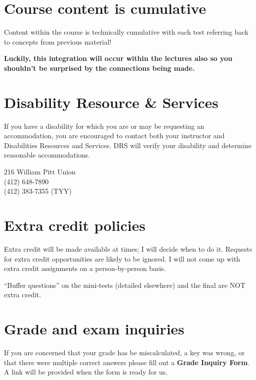 \documentclass[
]{book}
\begin{document}
\hypertarget{course-content-is-cumulative}{%
\chapter{Course content is cumulative}\label{course-content-is-cumulative}}

Content within the course is technically cumulative with each test referring back to concepts from previous material!

\textbf{Luckily, this integration will occur within the lectures also so you shouldn't be surprised by the connections being made.}

\hypertarget{DRS}{%
\chapter{Disability Resource \& Services}\label{DRS}}

If you have a disability for which you are or may be requesting an accommodation, you are encouraged to contact both your instructor and Disabilities Resources and Services. DRS will verify your disability and determine reasonable accommodations.

216 William Pitt Union\\
(412) 648-7890\\
(412) 383-7355 (TYY)

\hypertarget{extracredit}{%
\chapter{Extra credit policies}\label{extracredit}}

Extra credit will be made available at times; I will decide when to do it. Requests for extra credit opportunities are likely to be ignored. I will not come up with extra credit assignments on a person-by-person basis.

``Buffer questions'' on the mini-tests (detailed elsewhere) and the final are NOT extra credit.

\hypertarget{grade-and-exam-inquiries}{%
\chapter{Grade and exam inquiries}\label{grade-and-exam-inquiries}}

If you are concerned that your grade has be miscalculated, a key was wrong, or that there were multiple correct answers please fill out a \textbf{Grade Inquiry Form}. A link will be provided when the form is ready for us.
\end{document}
